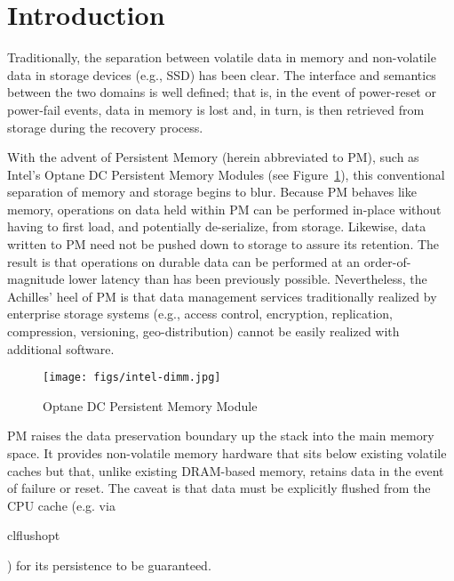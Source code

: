 \documentclass[letterpaper,twocolumn,10pt]{article}
\newcommand{\pmem}{PM\xspace}
\newcommand{\code}[1]{\begin{ttcodefont}#1\end{ttcodefont}}
\begin{document}
\section{Introduction}

Traditionally, the separation between volatile data in memory and
non-volatile data in storage devices (e.g., SSD) has been clear.  The
interface and semantics between the two domains is well defined; that
is, in the event of power-reset or power-fail events, data in memory
is lost and, in turn, is then retrieved from storage during the
recovery process.

With the advent of Persistent Memory (herein abbreviated to \pmem),
such as Intel's Optane DC Persistent Memory Modules (see
Figure~\ref{fig:aep}), this conventional separation of memory and
storage begins to blur.  Because \pmem behaves like memory, operations
on data held within \pmem can be performed in-place without having to
first load, and potentially de-serialize, from storage.  Likewise,
data written to \pmem need not be pushed down to storage to assure its
retention.  The result is that operations on durable data can be
performed at an order-of-magnitude lower latency than has been
previously possible.  Nevertheless, the Achilles' heel of \pmem is
that data management services traditionally realized by enterprise
storage systems (e.g., access control, encryption, replication,
compression, versioning, geo-distribution) cannot be easily realized
with additional software.

\begin{figure}[ht]
\centering
\texttt{[image: figs/intel-dimm.jpg]}
\caption{Optane DC Persistent Memory Module}
\label{fig:aep}
\end{figure}

\pmem raises the data preservation boundary up
the stack into the main memory space.  It provides non-volatile memory
hardware that sits below existing volatile caches but that, unlike
existing DRAM-based memory, retains data in the event of failure
or reset.  The caveat is that data must be explicitly flushed from the
CPU cache (e.g. via \code{clflushopt}) for its persistence to be guaranteed.
\end{document}

